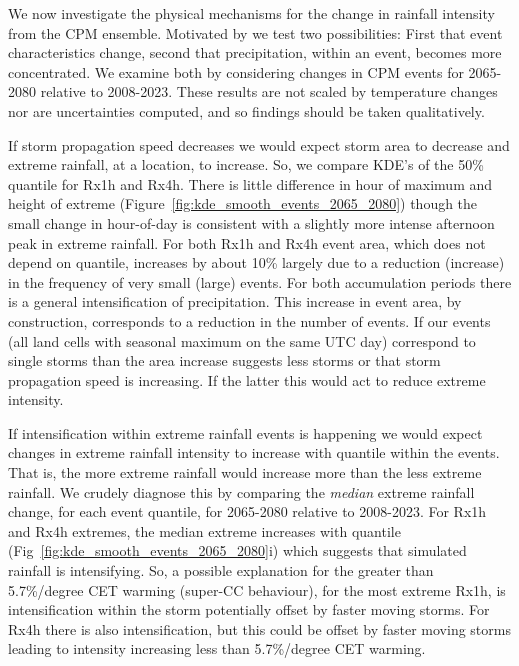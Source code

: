 \documentclass[11pt,a4paper]{article}
\begin{document}
We now investigate the physical mechanisms for the change in rainfall intensity from the CPM ensemble. Motivated by \cite{fowler2021rainfall_extremes} we test two possibilities:  First that event characteristics change, second  that precipitation, within an event, becomes more concentrated. We examine both by considering changes in CPM events for 2065-2080 relative to 2008-2023. These results are not scaled by temperature changes nor are uncertainties computed, and so findings should be taken qualitatively. 



 If storm propagation speed decreases  we would expect storm area to decrease and extreme rainfall, at a location, to increase.  So, we  compare KDE's of the 50\% quantile for  Rx1h and Rx4h. There is little difference in hour of maximum and height of extreme (Figure~\ref{fig:kde_smooth_events_2065_2080}) though the small change in hour-of-day is consistent with a slightly more intense afternoon peak in extreme rainfall. For both Rx1h and Rx4h event area, which does not depend on quantile, increases by about 10\% largely due to a reduction (increase)  in the frequency of very small (large) events.  For both accumulation periods  there is a general intensification of precipitation.  This increase in event area, by construction, corresponds to a reduction in the number of events. If our events (all land cells with seasonal maximum on the same UTC day)  correspond to single storms than the area increase suggests less storms or that storm propagation speed is increasing. If the latter this would act to reduce extreme intensity. 
 
If intensification within extreme rainfall events is happening we would expect changes in extreme rainfall intensity to increase with quantile within the events. That is, the more extreme rainfall would increase more than the less extreme rainfall.  We crudely diagnose this by comparing the \textit{median} extreme rainfall change, for each event quantile, for 2065-2080 relative to 2008-2023. For  Rx1h and Rx4h extremes, the median extreme increases with quantile (Fig~\ref{fig:kde_smooth_events_2065_2080}i) which suggests that simulated rainfall is intensifying.  So, a possible explanation for the greater than 5.7\%/degree CET warming (super-CC behaviour), for the most extreme Rx1h, is intensification within the storm potentially offset by faster moving storms. For Rx4h there is also intensification, but this could be offset  by faster moving storms leading to intensity increasing less than 5.7\%/degree CET warming. 
 
\end{document}
